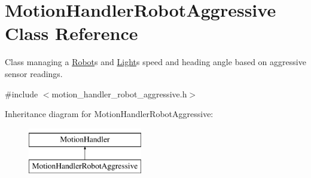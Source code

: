 \hypertarget{class_motion_handler_robot_aggressive}{}\section{Motion\+Handler\+Robot\+Aggressive Class Reference}
\label{class_motion_handler_robot_aggressive}


Class managing a \hyperlink{class_robot}{Robot}\textquotesingle{}s and \hyperlink{class_light}{Light}\textquotesingle{}s speed and heading angle based on aggressive sensor readings.  




{\ttfamily \#include $<$motion\+\_\+handler\+\_\+robot\+\_\+aggressive.\+h$>$}

Inheritance diagram for Motion\+Handler\+Robot\+Aggressive\+:\begin{figure}[H]
\begin{center}
\leavevmode
\includegraphics[height=2.000000cm]{class_motion_handler_robot_aggressive}
\end{center}
\end{figure}
